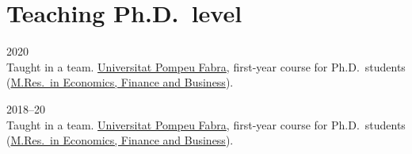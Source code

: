 \section*{Teaching \small{Ph.D.\ level}}

\begin{paracol}{2}
  2020
\switchcolumn
  \\
  Taught in a team.
  \href{https://www.upf.edu/}{Universitat Pompeu Fabra}, first-year course for Ph.D.\ students (\href{https://www.upf.edu/web/econ/mres-i-phd}{M.Res.\ in Economics, Finance and Business}).
\end{paracol}

\begin{paracol}{2}
  2018--20
\switchcolumn
  \\
  Taught in a team.
  \href{https://www.upf.edu/}{Universitat Pompeu Fabra}, first-year course for Ph.D.\ students (\href{https://www.upf.edu/web/econ/mres-i-phd}{M.Res.\ in Economics, Finance and Business}).
\end{paracol}